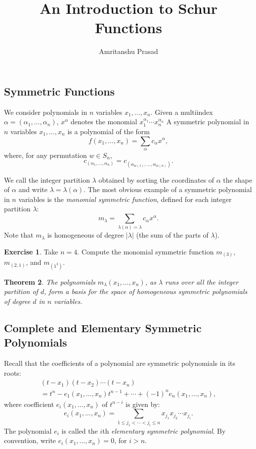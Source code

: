 \documentclass[12pt]{amsart}
\title{An Introduction to Schur Functions}
\author{Amritanshu Prasad}
\newtheorem{theorem}{Theorem}[subsection]
\theoremstyle{definition}
\theoremstyle{example}
\newtheorem{exercise}[theorem]{Exercise}
\begin{document}
\maketitle
\renewcommand{\thesubsection}{\arabic{subsection}}
\subsection{Symmetric Functions}
\label{sec:symmetric-functions}
We consider polynomials in $n$ variables $x_1,\dotsc,x_n$.
Given a multiindex $\alpha=(\alpha_1,\dotsc, \alpha_n)$, $x^\alpha$ denotes the monomial $x_1^{\alpha_1}\dotsb x_n^{\alpha_n}$
A symmetric polynomial in $n$ variables $x_1,\dotsc, x_n$ is a polynomial of the form
\begin{displaymath}
  f(x_1,\dotsc, x_n) = \sum_{\alpha} c_\alpha x^\alpha,
\end{displaymath}
where, for any permutation $w\in S_n$,
\begin{displaymath}
  c_{(\alpha_1,\dotsc,\alpha_n)} = c_{(\alpha_{w(1)},\dotsc,\alpha_{w(n)})}.
\end{displaymath}

We call the integer partition $\lambda$ obtained by sorting the coordinates of $\alpha$ the shape of $\alpha$ and write $\lambda = \lambda(\alpha)$.
The most obvious example of a symmetric polynomial in $n$ variables is the \emph{monomial symmetric function}, defined for each integer partition $\lambda$:
\begin{displaymath}
  m_\lambda = \sum_{\lambda(\alpha) = \lambda} c_\alpha x^\alpha.
\end{displaymath}
Note that $m_\lambda$ is homogeneous of degree $|\lambda|$ (the sum of the parts of $\lambda$).
\begin{exercise}
  Take $n=4$. Compute the monomial symmetric function $m_{(3)}$, $m_{(2,1)}$, and $m_{(1^3)}$.
\end{exercise}
\begin{theorem}
The polynomials $m_\lambda(x_1,\dotsc,x_n)$, as $\lambda$ runs over all the integer partition of $d$, form a basis for the space of homogeneous symmetric polynomials of degree $d$ in $n$ variables.
\end{theorem}
\subsection{Complete and Elementary Symmetric Polynomials}
\label{sec:compl-elem-symm}
Recall that the coefficients of a polynomial are symmetric polynomials in its roots:
\begin{multline}
  \label{eq:elem-id}
  (t-x_1)(t-x_2)\dotsb (t-x_n) \\= t^n - e_1(x_1,\dotsc, x_n)t^{n-1} + \dotsb + (-1)^n e_n(x_1,\dotsc, x_n),
\end{multline}
where coefficient $e_i(x_1,\dotsc, x_n)$ of $t^{n-i}$ is given by:
\begin{equation}
  \label{eq:elem}
  e_i(x_1,\dotsc, x_n) = \sum_{1\leq j_1<\dotsb<j_i\leq n} x_{j_1}x_{j_2}\dotsb x_{j_i}.
\end{equation}
The polynomial $e_i$ is called the $i$th \emph{elementary symmetric polynomial}.
By convention, write $e_i(x_1,\dotsc,x_n)=0$, for $i>n$.
\end{document}
